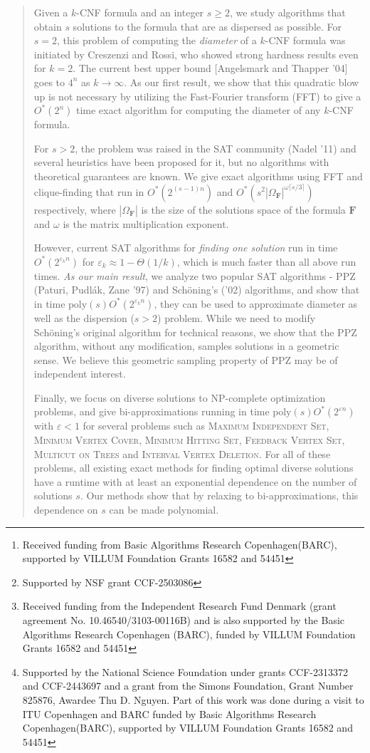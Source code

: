 \documentclass[11pt, letterpaper]{article}
\author[1]{Per Austrin}
\author[1]{Ioana O. Bercea\footnote{Received funding from Basic Algorithms Research Copenhagen(BARC), supported by VILLUM Foundation Grants 16582 and 54451}}
\author[2]{Mayank Goswami\footnote{Supported by NSF grant CCF-2503086}}
\author[3]{\\Nutan Limaye\footnote{Received funding from the Independent Research Fund Denmark (grant agreement No. 10.46540/3103-00116B) and is also supported by the Basic Algorithms Research Copenhagen (BARC), funded by VILLUM Foundation Grants 16582 and 54451}}
\author[4]{Adarsh Srinivasan \footnote{Supported by the National Science Foundation under grants CCF-2313372 and CCF-2443697 and a grant from the Simons Foundation, Grant Number 825876, Awardee Thu D. Nguyen. Part of this work was done during a visit to ITU Copenhagen and BARC funded by Basic Algorithms Research Copenhagen(BARC), supported by VILLUM Foundation Grants 16582 and 54451}}
\affil[1]{ KTH Royal Institute of Technology \\ \tt{\{austrin,bercea\}@kth.se}}
\affil[2]{Queens College, City University of New York\\
\tt{mayank.goswami@qc.cuny.edu}}
\affil[3]{IT University of Copenhagen\\
\tt{nuli@itu.dk}}
\affil[4]{Rutgers University\\
\tt{adarsh.srinivasan@rutgers.edu}}
\date{\vspace{-8ex}}
\theoremstyle{definition}
\newcommand{\f}{\mathbf{F}}
\newcommand{\Om}{\Omega_{\f}}
\begin{document}
\maketitle 
\thispagestyle{empty}
\begin{abstract}


Given a $k$-CNF formula and an integer $s \geq 2$, we study algorithms that obtain $s$ solutions to the formula that are as dispersed as possible. For $s=2$, this problem of computing the \emph{diameter} of a $k$-CNF formula was initiated by Creszenzi and Rossi, who showed strong hardness results even for $k=2$. The current best upper bound [Angelsmark and Thapper '04] goes to $4^n$ as $k \rightarrow \infty$. As our first result, we show that this quadratic blow up is not necessary by utilizing the Fast-Fourier transform (FFT) to give a $O^*(2^n)$ time exact algorithm for computing the diameter of any $k$-CNF formula. 

For $s>2$, the problem was raised in the SAT community (Nadel '11) and several heuristics have been proposed for it, but no algorithms with theoretical guarantees are known. We give exact algorithms using FFT and clique-finding that run in $O^*(2^{(s-1)n})$ and $O^*(s^2 |\Om|^{\omega \lceil s/3 \rceil})$ respectively, where $|\Om|$ is the size of the solutions space of the formula $\f$ and $\omega$ is the matrix multiplication exponent.

However, current SAT algorithms for \emph{finding one solution} run in time $O^*(2^{\varepsilon_{k}n})$ for $\varepsilon_{k} \approx 1-\Theta(1/k)$, which is much faster than all above run times. \emph{As our main result}, we analyze two popular SAT algorithms - PPZ (Paturi, Pudl\'ak, Zane '97) and Sch\"{o}ning's ('02) algorithms, and show that in time $\text{poly}(s)O^*(2^{\varepsilon_{k}n})$, they can be used to approximate diameter as well as the dispersion ($s>2$) problem. While we need to modify Sch\"{o}ning's original algorithm for technical reasons, we show that the PPZ algorithm, without any modification, samples solutions in a geometric sense. We believe this geometric sampling property of PPZ may be of independent interest.

Finally, we focus on diverse solutions to NP-complete optimization problems, and give bi-approximations running in time $\text{poly}(s)O^*(2^{\varepsilon n})$ with $\varepsilon<1$ for several problems such as  \textsc{Maximum Independent Set}, \textsc{Minimum Vertex Cover}, \textsc{Minimum Hitting Set}, \textsc{Feedback Vertex Set}, \textsc{Multicut on Trees} and \textsc{Interval Vertex Deletion}. For all of these problems, all existing exact methods for finding optimal diverse solutions have a runtime with at least an exponential dependence on the number of solutions $s$. Our methods show that by relaxing to bi-approximations, this dependence on $s$ can be made polynomial.



\end{abstract}
\end{document}
